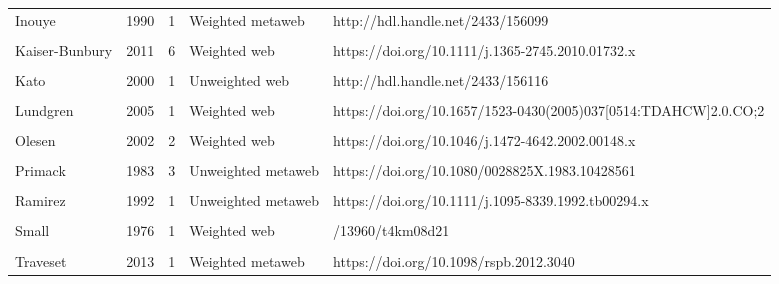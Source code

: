 \documentclass[]{article}
\begin{document}
\begin{landscape}
\begin{longtable}[l]{lrlll}
\addlinespace
Inouye & 1990 & 1 & Weighted metaweb & http://hdl.handle.net/2433/156099\\
\addlinespace
\cellcolor{gray!6}{Kaiser-Bunbury} & \cellcolor{gray!6}{2017} & \cellcolor{gray!6}{8} & \cellcolor{gray!6}{Weighted web} & \cellcolor{gray!6}{https://doi.org/10.1038/nature21071}\\
\addlinespace
Kaiser-Bunbury & 2011 & 6 & Weighted web & https://doi.org/10.1111/j.1365-2745.2010.01732.x\\
\addlinespace
\cellcolor{gray!6}{Kaiser-Bunbury} & \cellcolor{gray!6}{2010} & \cellcolor{gray!6}{2} & \cellcolor{gray!6}{Weighted web} & \cellcolor{gray!6}{https://doi.org/10.1016/j.ppees.2009.04.001}\\
\addlinespace
Kato & 2000 & 1 & Unweighted web & http://hdl.handle.net/2433/156116\\
\addlinespace
\cellcolor{gray!6}{Kevan} & \cellcolor{gray!6}{1970} & \cellcolor{gray!6}{1} & \cellcolor{gray!6}{Unweighted web} & \cellcolor{gray!6}{https://doi.org/10.2307/2258569}\\
\addlinespace
Lundgren & 2005 & 1 & Weighted web & https://doi.org/10.1657/1523-0430(2005)037[0514:TDAHCW]2.0.CO;2\\
\addlinespace
\cellcolor{gray!6}{McMullen} & \cellcolor{gray!6}{1993} & \cellcolor{gray!6}{1} & \cellcolor{gray!6}{Unweighted metaweb} & \cellcolor{gray!6}{https://biostor.org/reference/244737}\\
\addlinespace
Olesen & 2002 & 2 & Weighted web & https://doi.org/10.1046/j.1472-4642.2002.00148.x\\
\addlinespace
\cellcolor{gray!6}{Peralta} & \cellcolor{gray!6}{2006} & \cellcolor{gray!6}{4} & \cellcolor{gray!6}{Weighted web} & \cellcolor{gray!6}{https://doi.org/10.1111/ele.13510}\\
\addlinespace
Primack & 1983 & 3 & Unweighted metaweb & https://doi.org/10.1080/0028825X.1983.10428561\\
\addlinespace
\cellcolor{gray!6}{Ramirez} & \cellcolor{gray!6}{1989} & \cellcolor{gray!6}{1} & \cellcolor{gray!6}{Unweighted web} & \cellcolor{gray!6}{https://doi.org/10.2307/2388282}\\
\addlinespace
Ramirez & 1992 & 1 & Unweighted metaweb & https://doi.org/10.1111/j.1095-8339.1992.tb00294.x\\
\addlinespace
\cellcolor{gray!6}{Robertson} & \cellcolor{gray!6}{1929} & \cellcolor{gray!6}{1} & \cellcolor{gray!6}{Unweighted metaweb} & \cellcolor{gray!6}{https://doi.org/10.5962/bhl.title.11538}\\
\addlinespace
Small & 1976 & 1 & Weighted web & /13960/t4km08d21\\
\addlinespace
\cellcolor{gray!6}{Souza} & \cellcolor{gray!6}{2017} & \cellcolor{gray!6}{1} & \cellcolor{gray!6}{Weighted web} & \cellcolor{gray!6}{https://doi.org/10.1111/1365-2745.12978}\\
\addlinespace
Traveset & 2013 & 1 & Weighted metaweb & https://doi.org/10.1098/rspb.2012.3040\\*
\end{longtable}
\endgroup{}

\end{landscape}
\end{document}
